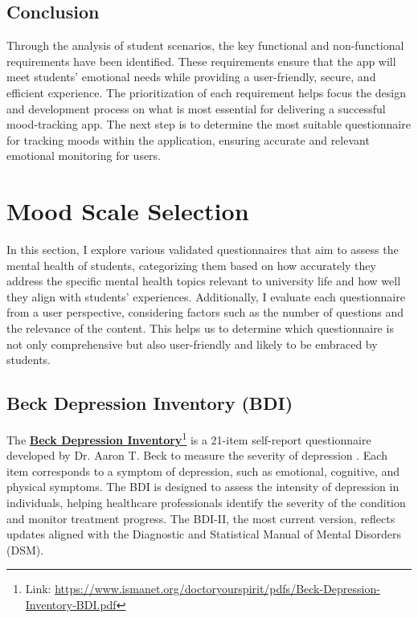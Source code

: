 \subsection{Conclusion}

Through the analysis of student scenarios, the key functional and non-functional requirements have been identified. These requirements ensure that the app will meet students' emotional needs while providing a user-friendly, secure, and efficient experience. The prioritization of each requirement helps focus the design and development process on what is most essential for delivering a successful mood-tracking app. The next step is to determine the most suitable questionnaire for tracking moods within the application, ensuring accurate and relevant emotional monitoring for users.

\section{Mood Scale Selection}

In this section, I explore various validated questionnaires that aim to assess the mental health of students, categorizing them based on how accurately they address the specific mental health topics relevant to university life and how well they align with students' experiences. Additionally, I evaluate each questionnaire from a user perspective, considering factors such as the number of questions and the relevance of the content. This helps us to determine which questionnaire is not only comprehensive but also user-friendly and likely to be embraced by students.

\subsection{Beck Depression Inventory (BDI)}

The \textbf{\href{https://www.ismanet.org/doctoryourspirit/pdfs/Beck-Depression-Inventory-BDI.pdf}{Beck Depression Inventory}}\footnote{Link: \url{https://www.ismanet.org/doctoryourspirit/pdfs/Beck-Depression-Inventory-BDI.pdf}} is a 21-item self-report questionnaire developed by Dr. Aaron T. Beck to measure the severity of depression \cite{bdi-review}. Each item corresponds to a symptom of depression, such as emotional, cognitive, and physical symptoms. The BDI is designed to assess the intensity of depression in individuals, helping healthcare professionals identify the severity of the condition and monitor treatment progress. The BDI-II, the most current version, reflects updates aligned with the Diagnostic and Statistical Manual of Mental Disorders (DSM).\vspace{5mm}

